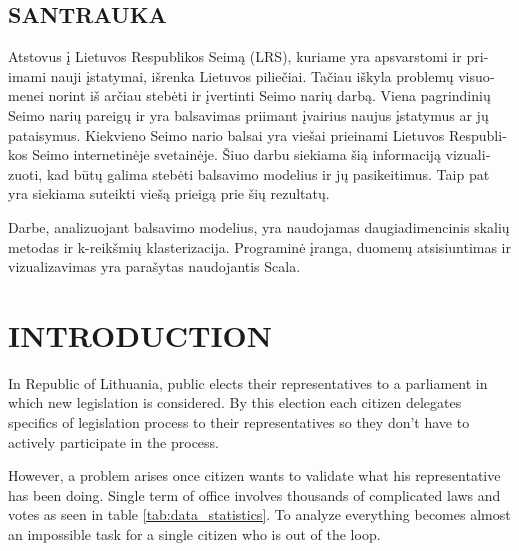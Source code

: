 \documentclass[a4paper,12pt]{article}
\begin{document}
	\begin{center}
		\section*{SANTRAUKA}
	\end{center}
	
	
	\begin{otherlanguage}{lithuanian}
		Atstovus į Lietuvos Respublikos Seimą (LRS), kuriame yra apsvarstomi ir priimami nauji įstatymai, išrenka Lietuvos piliečiai. Tačiau iškyla problemų visuomenei norint iš arčiau stebėti ir įvertinti Seimo narių darbą. Viena pagrindinių Seimo narių pareigų ir yra balsavimas priimant įvairius naujus įstatymus ar jų pataisymus. Kiekvieno Seimo nario balsai yra viešai prieinami Lietuvos Respublikos Seimo internetinėje svetainėje. Šiuo darbu siekiama šią informaciją vizualizuoti, kad būtų galima stebėti balsavimo modelius ir jų pasikeitimus. Taip pat yra siekiama suteikti viešą prieigą prie šių rezultatų.
		
		Darbe, analizuojant balsavimo modelius, yra naudojamas daugiadimencinis skalių metodas ir k-reikšmių klasterizacija. Programinė įranga, duomenų atsisiuntimas ir vizualizavimas yra parašytas naudojantis Scala.
		
	\end{otherlanguage}
	
	\clearpage
	
	\begingroup
	\singlespacing
	\tableofcontents
	\endgroup
	
	\clearpage
	
	\printglossary[type=\acronymtype,title={ACRONYMS}]
	
	\clearpage
	
	\printglossary[title={GLOSSARY}]
	
	\clearpage
	
	
	\section{INTRODUCTION}
	
	In Republic of Lithuania, public elects their representatives to a parliament in which new legislation is considered. By this election each citizen delegates specifics of legislation process to their representatives so they don't have to actively participate in the process.
	
	However, a problem arises once citizen wants to validate what his representative has been doing. Single term of office involves thousands of complicated laws and votes as seen in table \ref{tab:data_statistics}. To analyze everything becomes almost an impossible task for a single citizen who is out of the loop. 
	
\end{document}
